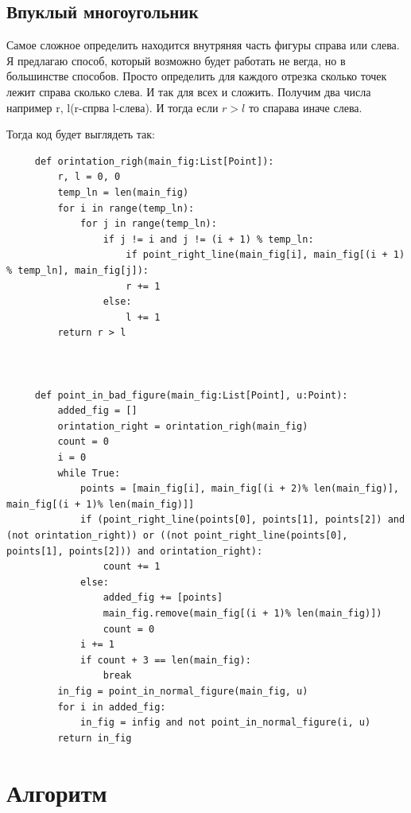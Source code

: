 \documentclass[12pt]{article} %
\begin{document}
 	 \subsection{Впуклый многоугольник}
 	 \hspace*{1cm}Самое сложное определить находится внутряняя часть фигуры справа или слева. Я предлагаю способ, который возможно будет работать не вегда, но в большинстве способов. Просто определить для каждого отрезка сколько точек лежит справа сколько слева. И так для всех и сложить. Получим два числа например r, l(r-спрва l-слева). И тогда если $r>l$ то спарава иначе слева. \par
 	 Тогда код будет выглядеть так:
 	 \begin{verbatim}
 	 def orintation_righ(main_fig:List[Point]):
 	     r, l = 0, 0
     	 temp_ln = len(main_fig)
 	     for i in range(temp_ln):
 	         for j in range(temp_ln):
 	             if j != i and j != (i + 1) % temp_ln:
 	                 if point_right_line(main_fig[i], main_fig[(i + 1) % temp_ln], main_fig[j]):
 	                 r += 1
 	             else:
 	                 l += 1
 	     return r > l
 	 
 	 
 	 
 	 def point_in_bad_figure(main_fig:List[Point], u:Point):
 	     added_fig = []
 	     orintation_right = orintation_righ(main_fig)
 	     count = 0
 	     i = 0
 	     while True:
 	         points = [main_fig[i], main_fig[(i + 2)% len(main_fig)], main_fig[(i + 1)% len(main_fig)]]
 	         if (point_right_line(points[0], points[1], points[2]) and (not orintation_right)) or ((not point_right_line(points[0], points[1], points[2])) and orintation_right):
 	             count += 1
 	         else:
 	             added_fig += [points]
 	             main_fig.remove(main_fig[(i + 1)% len(main_fig)])
 	             count = 0
 	         i += 1
 	         if count + 3 == len(main_fig):     
 	             break
 	     in_fig = point_in_normal_figure(main_fig, u)
 	     for i in added_fig:
 	         in_fig = infig and not point_in_normal_figure(i, u)
 	     return in_fig
 	\end{verbatim}
 	\section{Алгоритм}
\end{document}
